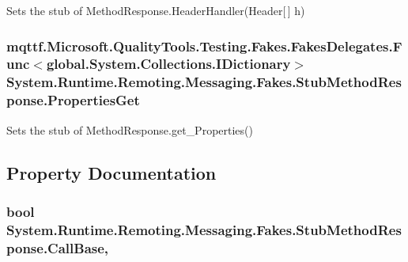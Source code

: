 Sets the stub of Method\-Response.\-Header\-Handler(\-Header\mbox{[}$\,$\mbox{]} h)

\hypertarget{class_system_1_1_runtime_1_1_remoting_1_1_messaging_1_1_fakes_1_1_stub_method_response_a972e7110a0245aa8945c266a5c2d511d}{
\subsubsection[{Properties\-Get}]{\setlength{\rightskip}{0pt plus 5cm}mqttf.\-Microsoft.\-Quality\-Tools.\-Testing.\-Fakes.\-Fakes\-Delegates.\-Func$<$global.\-System.\-Collections.\-I\-Dictionary$>$ System.\-Runtime.\-Remoting.\-Messaging.\-Fakes.\-Stub\-Method\-Response.\-Properties\-Get}}\label{class_system_1_1_runtime_1_1_remoting_1_1_messaging_1_1_fakes_1_1_stub_method_response_a972e7110a0245aa8945c266a5c2d511d}


Sets the stub of Method\-Response.\-get\-\_\-\-Properties()



\subsection{Property Documentation}
\hypertarget{class_system_1_1_runtime_1_1_remoting_1_1_messaging_1_1_fakes_1_1_stub_method_response_afd23b9ba6020f3602fa103d36841043b}{
\subsubsection[{Call\-Base}]{\setlength{\rightskip}{0pt plus 5cm}bool System.\-Runtime.\-Remoting.\-Messaging.\-Fakes.\-Stub\-Method\-Response.\-Call\-Base\hspace{0.3cm}{\ttfamily [get]}, {\ttfamily [set]}}}\label{class_system_1_1_runtime_1_1_remoting_1_1_messaging_1_1_fakes_1_1_stub_method_response_afd23b9ba6020f3602fa103d36841043b}


